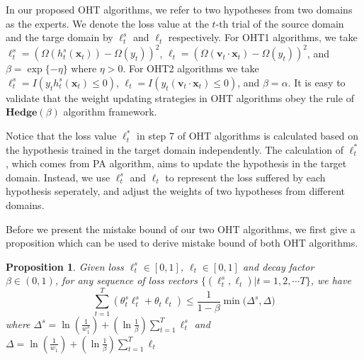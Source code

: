 \documentclass{article} %
\newtheorem{prop}{Proposition}
\theoremstyle{remark}
\theoremstyle{definition}
\begin{document}
In our proposed OHT algorithms, we refer to two hypotheses from two domains as the experts.
We denote the loss value at the $t$-th trial of the source domain and the targe domain by $\ell_{t}^{s}$ and $\ell_t$ respectively.
For OHT1 algorithms, we take $\ell_{t}^{s} = (\varOmega(h_{t}^{s}(\mathbf{x}_t)) - \varOmega(y_t)) ^ 2$, $\ell_t = (\varOmega(\mathbf{v}_t \cdot \mathbf{x}_t) - \varOmega(y_t)) ^ 2$, and $\beta = \exp\{-\eta\}$ where $\eta > 0$.
For OHT2 algorithms we take $\ell_{t}^{s} = I(y_t h_{t}^{s}(\mathbf{x}_t) \leq 0)$, $\ell_t = I(y_t (\mathbf{v}_t \cdot \mathbf{x}_t) \leq 0)$, and $\beta = \alpha$.
It is easy to validate that the weight updating strategies in OHT algorithms obey the rule of $\mathbf{Hedge}(\beta)$ algorithm framework.

Notice that the loss value $\ell_{t}^{*}$ in step 7 of OHT algorithms is calculated based on the hypothesis trained in the target domain independently.
The calculation of $\ell_{t}^{*}$, which comes from PA algorithm, aims to update the hypothesis in the target domain.
Instead, we use $\ell_{t}^{s}$ and $\ell_t$ to represent the loss suffered by each hypothesis seperately, and adjust the weights of two hypotheses from different domains.

Before we present the mistake bound of our two OHT algorithms, we first give a proposition which can be used to derive mistake bound of both OHT algorithms.

\begin{prop}
Given loss $\ell_{t}^{s} \in [0,1]$, $\ell_t \in [0,1]$ and decay factor $\beta \in (0,1)$, for any sequence of loss vectors $\{ (\ell_{t}^{s}, \ell_{t}) | t = 1, 2, \cdots T \} $, we have
$$ \sum\limits_{t=1}^{T} ( \theta_{t}^{s} \ell_{t}^{s} + \theta_t \ell_t ) \leq \frac{1}{1-\beta} \min \big( \varDelta^s, \varDelta \big) $$
where
$ \varDelta^s = \ln(\frac{1}{w_{1}^{s}}) + (\ln \frac{1}{\beta}) \sum\limits_{t=1}^{T} \ell_{t}^{s} $ and $ \varDelta = \ln(\frac{1}{w_{1}}) + (\ln \frac{1}{\beta}) \sum\limits_{t=1}^{T} \ell_{t} $
\end{prop}
\end{document}
